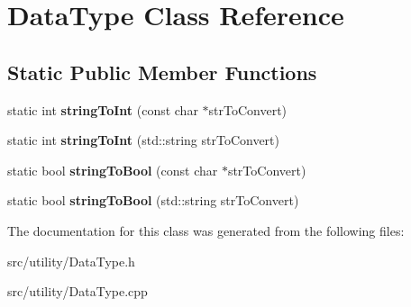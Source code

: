 \hypertarget{classDataType}{
\section{\-Data\-Type \-Class \-Reference}
\label{classDataType}
}
\subsection*{\-Static \-Public \-Member \-Functions}
\begin{DoxyCompactItemize}
\item 
\hypertarget{classDataType_a4e9fe93ed4d6d8fd17ba83df858c25f7}{
static int {\bfseries string\-To\-Int} (const char $\ast$str\-To\-Convert)}
\label{classDataType_a4e9fe93ed4d6d8fd17ba83df858c25f7}

\item 
\hypertarget{classDataType_aaae9ae09fb909e28bab26e0d9dec7720}{
static int {\bfseries string\-To\-Int} (std\-::string str\-To\-Convert)}
\label{classDataType_aaae9ae09fb909e28bab26e0d9dec7720}

\item 
\hypertarget{classDataType_a818114c8f0bf29afdfbdebd1674bc39d}{
static bool {\bfseries string\-To\-Bool} (const char $\ast$str\-To\-Convert)}
\label{classDataType_a818114c8f0bf29afdfbdebd1674bc39d}

\item 
\hypertarget{classDataType_a471ff364ba5183ac4750a1efb2efeaec}{
static bool {\bfseries string\-To\-Bool} (std\-::string str\-To\-Convert)}
\label{classDataType_a471ff364ba5183ac4750a1efb2efeaec}

\end{DoxyCompactItemize}


\-The documentation for this class was generated from the following files\-:\begin{DoxyCompactItemize}
\item 
src/utility/\-Data\-Type.\-h\item 
src/utility/\-Data\-Type.\-cpp\end{DoxyCompactItemize}

